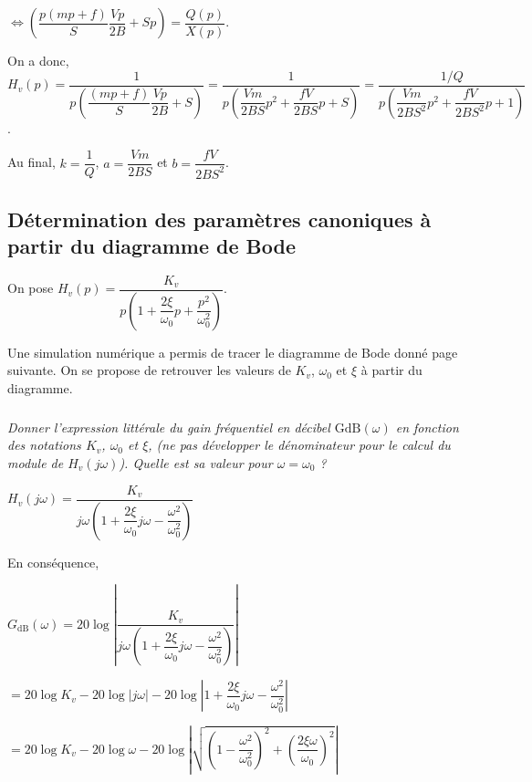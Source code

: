 \documentclass[10pt,fleqn]{article} %
\begin{document}
\begin{multicols}{2}
\begin{corrige}
$\Longleftrightarrow
\left(\dfrac{p\left(mp+f\right)}{S} \dfrac{Vp}{2B}+Sp \right) =
\dfrac{Q(p)}{ X(p)}$.


On a donc, 
$H_v(p)
=\dfrac{1}{p\left(\dfrac{\left(mp+f\right)}{S} \dfrac{Vp}{2B}+S \right)}
=\dfrac{1}{p\left(\dfrac{Vm}{2BS}p^2+ \dfrac{fV}{2BS}p+S \right)}
=\dfrac{1/Q}{p\left(\dfrac{Vm}{2BS^2}p^2+ \dfrac{fV}{2BS^2}p+1 \right)}
$.

Au final, $k=\dfrac{1}{Q}$, $a=\dfrac{Vm}{2BS}$ et $b=\dfrac{fV}{2BS^2}$.
\end{corrige} \else \fi

\subsection*{Détermination des paramètres canoniques à partir du diagramme de Bode}
\ifprof
\else
On pose $H_v(p)=\dfrac{K_v}{p\left( 1+\dfrac{2\xi}{\omega_0} p + \dfrac{p^2}{\omega_0^2} \right)}$. 

Une simulation numérique a permis de tracer le diagramme de Bode donné page suivante. On se propose de retrouver les valeurs de $K_v$, $\omega_0$ et $\xi$ à partir du diagramme.

\fi

\subparagraph{}\textit{Donner l'expression littérale du gain fréquentiel en décibel $\text{GdB}(\omega)$ en fonction des notations $K_v$, $\omega_0$ et $\xi$, (ne pas développer le dénominateur pour le calcul du module de $H_v(j\omega)$). Quelle est sa valeur pour $\omega=\omega_0$ ?}

\ifprof \begin{corrige}
$H_v(j\omega )=\dfrac{K_v}{j\omega\left( 1+\dfrac{2\xi}{\omega_0} j\omega - \dfrac{\omega^2}{\omega_0^2} \right)}$

En conséquence, 

$
G_{\text{dB}}\left(\omega \right)=20\log\left| \dfrac{K_v}{j\omega\left( 1+\dfrac{2\xi}{\omega_0} j\omega - \dfrac{\omega^2}{\omega_0^2} \right)} \right|
$

$
=20\log K_v- 20\log  \left| j\omega\right| - 20\log  \left| 1+\dfrac{2\xi}{\omega_0} j\omega - \dfrac{\omega^2}{\omega_0^2}  \right|
$

$
=20\log K_v- 20\log  \omega - 20\log  \left| \sqrt{\left(1- \dfrac{\omega^2}{\omega_0^2} \right)^2+\left( \dfrac{2\xi\omega }{\omega_0} \right)^2} \right|
$


\end{corrige}
\end{multicols}
\end{document}
